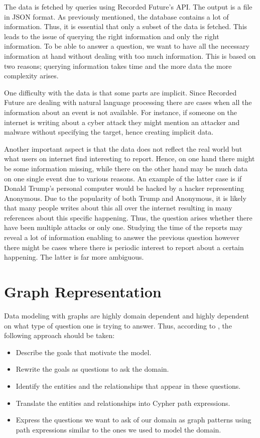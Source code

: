 The data is fetched by queries using Recorded Future's API. The output is a file in JSON format. As previously mentioned, the database contains a lot of information. Thus, it is essential that only a subset of the data is fetched. This leads to the issue of querying the right information and only the right information. To be able to answer a question, we want to have all the necessary information at hand without dealing with too much information. This is based on two reasons; querying information takes time and the more data the more complexity arises.

One difficulty with the data is that some parts are implicit. Since Recorded Future are dealing with natural language processing there are cases when all the information about an event is not available. For instance, if someone on the internet is writing about a cyber attack they might mention an attacker and malware without specifying the target, hence creating implicit data.

Another important aspect is that the data does not reflect the real world but what users on internet find interesting to report. Hence, on one hand there might be some information missing, while there on the other hand may be much data on one single event due to various reasons. An example of the latter case is if Donald Trump's personal computer would be hacked by a hacker representing Anonymous. Due to the popularity of both Trump and Anonymous, it is likely that many people writes about this all over the internet resulting in many references about this specific happening. Thus, the question arises whether there have been multiple attacks or only one. Studying the time of the reports may reveal a lot of information enabling to answer the previous question however there might be cases where there is periodic interest to report about a certain happening. The latter is far more ambiguous.

\section{Graph Representation}
Data modeling with graphs are highly domain dependent and highly dependent on what type of question one is trying to answer. Thus, according to \citet{robinson2013}, the following approach should be taken:
\begin{itemize}
    \item Describe the goals that motivate the model.
    \item Rewrite the goals as questions to ask the domain.
    \item Identify the entities and the relationships that appear in these questions. 
    \item Translate the entities and relationships into Cypher path expressions.
    \item Express the questions we want to ask of our domain as graph patterns using path expressions similar to the ones we used to model the domain. 
\end{itemize}

